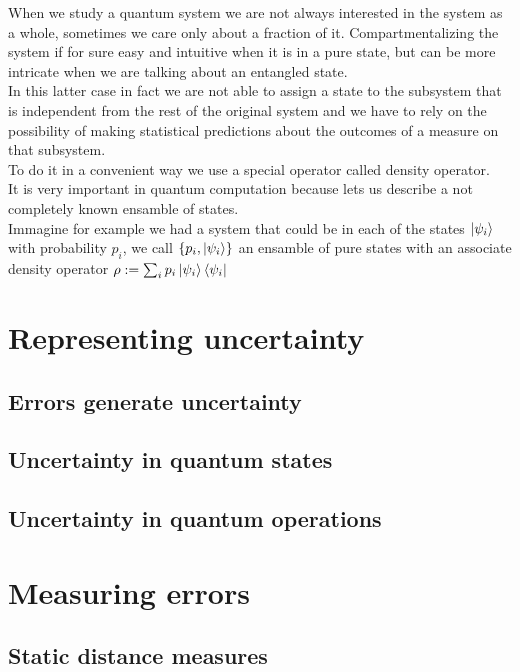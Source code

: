 \documentclass{article}
\begin{document}
When we study a quantum system we are not always interested in the
system
as a whole, sometimes we care only about a fraction of it.
Compartmentalizing the system if for sure easy and intuitive when it
is in a pure state, but can be more intricate when we are talking about
an entangled state.\\
In this latter case in fact we are not able to assign a state to the
subsystem that is independent from the rest of the original system
and we have to rely on the possibility of making statistical
predictions
about the outcomes of a measure on that subsystem.\\
To do it in a convenient way we use a special operator called density
operator.\\
It is very important in quantum computation because lets us describe
a not completely known ensamble of states.\\
Immagine for example we had a system that could be in each of the
states
$\ket{\psi_i}$ with probability $p_i$, we call $\{p_i,\ket{\psi_i}\}$ an
ensamble of pure states with an associate density operator
$\rho:=\sum_i p_i \ket{\psi_i}\bra{\psi_i} $



\section{Representing uncertainty}


\subsection{Errors generate uncertainty}



\subsection{Uncertainty in quantum states}

\subsection{Uncertainty in quantum operations}

\section{Measuring errors}

\subsection{Static distance measures}
\end{document}
